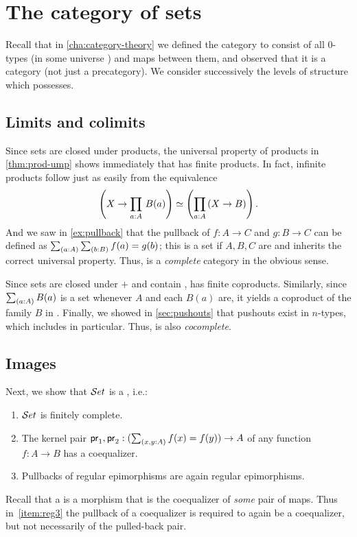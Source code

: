 \section{The category of sets}
\label{sec:piw-pretopos}

Recall that in \autoref{cha:category-theory} we defined the category \uset to consist of all $0$-types (in some universe \UU) and maps between them, and observed that it is a category (not just a precategory).
We consider successively the levels of structure which \uset possesses.

\subsection{Limits and colimits}
\label{subsec:limits-sets}

Since sets are closed under products, the universal property of products in \autoref{thm:prod-ump} shows immediately that \uset has finite products.
In fact, infinite products follow just as easily from the equivalence
\[ \left(X\to \prd{a:A} B(a) \right) \simeq \left(\prd{a:A} (X\to B)\right) .\]
And we saw in \autoref{ex:pullback} that the pullback of $f:A\to C$ and $g:B\to C$ can be defined as $\sm{a:A}{b:B} f(a)=g(b)$; this is a set if $A,B,C$ are and inherits the correct universal property.
Thus, \uset is a \emph{complete} category in the obvious sense.

Since sets are closed under $+$ and contain \emptyt, \uset has finite coproducts.
Similarly, since $\sm{a:A}B(a)$ is a set whenever $A$ and each $B(a)$ are, it yields a coproduct of the family $B$ in \uset.
Finally, we showed in \autoref{sec:pushouts} that pushouts exist in $n$-types, which includes \uset in particular.
Thus, \uset is also \emph{cocomplete}.

\subsection{Images}
\label{sec:image}

Next, we show that $\mathcal{S}et$ is a , i.e.:
%
\begin{enumerate}
\item $\mathcal{S}et$ is finitely complete.\label{item:reg1}
\item The kernel pair $\proj1,\proj2: (\sm{x,y:A} f(x)= f(y)) \to A$ of any
      function $f : A \to B$ has a coequalizer.\label{item:reg2}
\item Pullbacks of regular epimorphisms are again regular epimorphisms.\label{item:reg3}
\end{enumerate}
%
Recall that a  is a morphism that is the coequalizer of \emph{some} pair of maps.
Thus in~\ref{item:reg3} the pullback of a coequalizer is required to again be a coequalizer, but not necessarily of the pulled-back pair.

